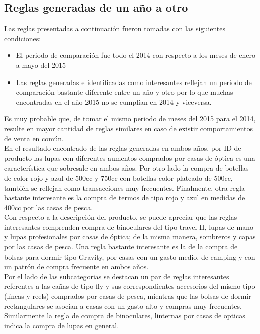 \documentclass[]{article}
\begin{document}
	\subsection{Reglas generadas de un año a otro}
	Las reglas presentadas a continuación fueron tomadas con las siguientes condiciones:
	\begin{itemize}
		\item El periodo de comparación fue todo el 2014 con respecto a los meses de enero a mayo del 2015
		\item Las reglas generadas e identificadas como interesantes reflejan un periodo de comparación bastante diferente entre un año y otro por lo que muchas encontradas en el año 2015 no se cumplían en 2014 y viceversa.
	\end{itemize}
	
	Es muy probable que, de tomar el mismo periodo de meses del 2015 para el 2014, resulte en mayor cantidad de reglas similares en caso de existir comportamientos de venta en común.\\
	
	En el resultado encontrado de las reglas generadas en ambos años, por ID de producto las lupas con diferentes aumentos comprados por casas de óptica es una característica que sobresale en ambos años. Por otro lado la compra de botellas de color rojo y azul de 500cc y 750cc con botellas color plateado de 500cc, también se reflejan como transacciones muy frecuentes. Finalmente, otra regla bastante interesante es la compra de termos de tipo rojo y azul en medidas de 400cc por las casas de pesca.\\
	
	Con respecto a la descripción del producto, se puede apreciar que las reglas interesantes comprenden compra de binoculares del tipo travel II, lupas de mano y lupas profesionales por casas de óptica; de la misma manera, sombreros y capas por las casas de pesca. Una regla bastante interesante es la de la compra de bolsas para dormir tipo Gravity, por casas con un gasto medio, de camping y con un patrón de compra frecuente en ambos años.\\
	
	Por el lado de las subcategorias se destacan un par de reglas interesantes referentes a las cañas de tipo fly y sus correspondientes accesorios del mismo tipo (líneas y reels) comprados por casas de pesca, mientras que las bolsas de dormir rectangulares se asocian a casas con un gasto alto y compras muy frecuentes. Similarmente la regla de compra de binoculares, linternas por casas de opticas indica la compra de lupas en general.\\
	
\end{document}
